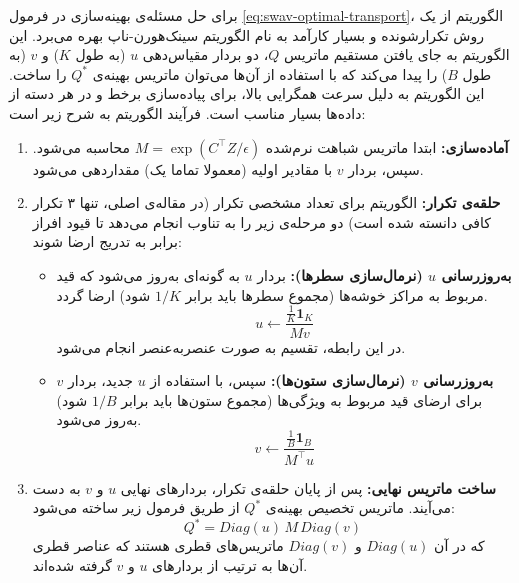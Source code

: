 برای حل مسئله‌ی بهینه‌سازی در فرمول \ref{eq:swav-optimal-transport}،
الگوریتم  از یک روش تکرارشونده و بسیار کارآمد به نام الگوریتم سینک‌هورن-ناپ\cite{cuturi2013sinkhorn} بهره می‌برد.
این الگوریتم به جای یافتن مستقیم ماتریس 
$Q$، دو بردار مقیاس‌دهی 
$u$
(به طول $K$) و $v$ (به طول $B$)
را پیدا می‌کند که با استفاده از آن‌ها می‌توان ماتریس بهینه‌ی $Q^*$ را ساخت. این الگوریتم به دلیل سرعت همگرایی بالا، برای پیاده‌سازی برخط و در هر دسته از داده‌ها بسیار مناسب است. فرآیند الگوریتم به شرح زیر است:

\begin{enumerate}
    \item \textbf{آماده‌سازی:} ابتدا ماتریس شباهت نرم‌شده $M = \exp(C^\top Z / \epsilon)$ محاسبه می‌شود. سپس، بردار 
    $v$
    با مقادیر اولیه (معمولا تماما یک) مقداردهی می‌شود.
    \item \textbf{حلقه‌ی تکرار:} الگوریتم برای تعداد مشخصی تکرار (در مقاله‌ی اصلی، تنها ۳ تکرار کافی دانسته شده است) دو مرحله‌ی زیر را به تناوب انجام می‌دهد تا قیود افراز برابر به تدریج ارضا شوند:
    \begin{itemize}
	\item \textbf{به‌روزرسانی $u$ (نرمال‌سازی سطرها):} بردار $u$ به گونه‌ای به‌روز می‌شود که قید مربوط به مراکز خوشه‌ها (مجموع سطرها باید برابر $1/K$ شود) ارضا گردد.
	\begin{equation}
		u \leftarrow \frac{\frac{1}{K} \mathbf{1}_K}{M v}
		\label{eq:update_u}
	\end{equation}
	در این رابطه، تقسیم به صورت عنصربه‌عنصر انجام می‌شود.
	
	\item \textbf{به‌روزرسانی $v$ (نرمال‌سازی ستون‌ها):} سپس، با استفاده از $u$ جدید، بردار $v$ برای ارضای قید مربوط به ویژگی‌ها (مجموع ستون‌ها باید برابر $1/B$ شود) به‌روز می‌شود.
	\begin{equation}
		v \leftarrow \frac{\frac{1}{B} \mathbf{1}_B}{M^\top u}
		\label{eq:update_v}
	\end{equation}
\end{itemize}

\item \textbf{ساخت ماتریس نهایی:} پس از پایان حلقه‌ی تکرار، بردارهای نهایی $u$ و $v$ به دست می‌آیند. ماتریس تخصیص بهینه‌ی $Q^*$ از طریق فرمول زیر ساخته می‌شود:
\begin{equation}
	Q^* = Diag(u) \, M \, Diag(v)
	\label{eq:final_q}
\end{equation}
که در آن $Diag(u)$ و $Diag(v)$ ماتریس‌های قطری هستند که عناصر قطری آن‌ها به ترتیب از بردارهای $u$ و $v$ گرفته شده‌اند.
\end{enumerate}

